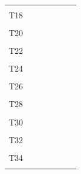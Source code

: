 \documentclass[
]{article}
\begin{document}
\begin{longtable}[l]{lllllll}
\cellcolor{gray!6}{T17} & \cellcolor{gray!6}{} & \cellcolor{gray!6}{} & \cellcolor{gray!6}{} & \cellcolor{gray!6}{} & \cellcolor{gray!6}{} & \cellcolor{gray!6}{}\\
T18 &  &  &  &  &  & \\
\cellcolor{gray!6}{T19} & \cellcolor{gray!6}{} & \cellcolor{gray!6}{} & \cellcolor{gray!6}{} & \cellcolor{gray!6}{} & \cellcolor{gray!6}{} & \cellcolor{gray!6}{}\\
T20 &  &  &  &  &  & \\
\addlinespace
\cellcolor{gray!6}{T21} & \cellcolor{gray!6}{} & \cellcolor{gray!6}{} & \cellcolor{gray!6}{} & \cellcolor{gray!6}{} & \cellcolor{gray!6}{} & \cellcolor{gray!6}{}\\
T22 &  &  &  &  &  & \\
\cellcolor{gray!6}{T23} & \cellcolor{gray!6}{} & \cellcolor{gray!6}{} & \cellcolor{gray!6}{} & \cellcolor{gray!6}{} & \cellcolor{gray!6}{} & \cellcolor{gray!6}{}\\
T24 &  &  &  &  &  & \\
\cellcolor{gray!6}{T25} & \cellcolor{gray!6}{} & \cellcolor{gray!6}{} & \cellcolor{gray!6}{} & \cellcolor{gray!6}{} & \cellcolor{gray!6}{} & \cellcolor{gray!6}{}\\
\addlinespace
T26 &  &  &  &  &  & \\
\cellcolor{gray!6}{T27} & \cellcolor{gray!6}{} & \cellcolor{gray!6}{} & \cellcolor{gray!6}{} & \cellcolor{gray!6}{} & \cellcolor{gray!6}{} & \cellcolor{gray!6}{}\\
T28 &  &  &  &  &  & \\
\cellcolor{gray!6}{T29} & \cellcolor{gray!6}{} & \cellcolor{gray!6}{} & \cellcolor{gray!6}{} & \cellcolor{gray!6}{} & \cellcolor{gray!6}{} & \cellcolor{gray!6}{}\\
T30 &  &  &  &  &  & \\
\addlinespace
\cellcolor{gray!6}{T31} & \cellcolor{gray!6}{} & \cellcolor{gray!6}{} & \cellcolor{gray!6}{} & \cellcolor{gray!6}{} & \cellcolor{gray!6}{} & \cellcolor{gray!6}{}\\
T32 &  &  &  &  &  & \\
\cellcolor{gray!6}{T33} & \cellcolor{gray!6}{} & \cellcolor{gray!6}{} & \cellcolor{gray!6}{} & \cellcolor{gray!6}{} & \cellcolor{gray!6}{} & \cellcolor{gray!6}{}\\
T34 &  &  &  &  &  & \\
\cellcolor{gray!6}{T35} & \cellcolor{gray!6}{} & \cellcolor{gray!6}{} & \cellcolor{gray!6}{} & \cellcolor{gray!6}{} & \cellcolor{gray!6}{} & \cellcolor{gray!6}{}\\

\end{longtable}
\end{document}
